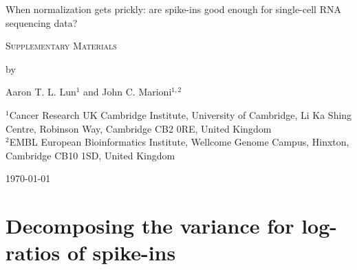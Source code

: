 \documentclass{article}
\begin{document}
\begin{titlepage}
\vspace*{3cm}
\begin{center}

{\LARGE
When normalization gets prickly: are spike-ins good enough for single-cell RNA sequencing data?
\par}

\vspace{0.75cm}

{\Large 
    \textsc{Supplementary Materials}
\par
}
\vspace{0.75cm}

\large
by


\vspace{0.75cm}
Aaron T. L. Lun$^{1}$ and John C. Marioni$^{1,2}$

\vspace{1cm}
\begin{minipage}{0.9\textwidth}
\begin{flushleft} 
$^1$Cancer Research UK Cambridge Institute, University of Cambridge, Li Ka Shing Centre, Robinson Way, Cambridge CB2 0RE, United Kingdom \\[6pt]
$^2$EMBL European Bioinformatics Institute, Wellcome Genome Campus, Hinxton, Cambridge CB10 1SD, United Kingdom \\[6pt]
\end{flushleft}
\end{minipage}

\vspace{1.5cm}
{\large \today{}}

\vspace*{\fill}
\end{center}
\end{titlepage}

\section{Decomposing the variance for log-ratios of spike-ins}
\end{document}
